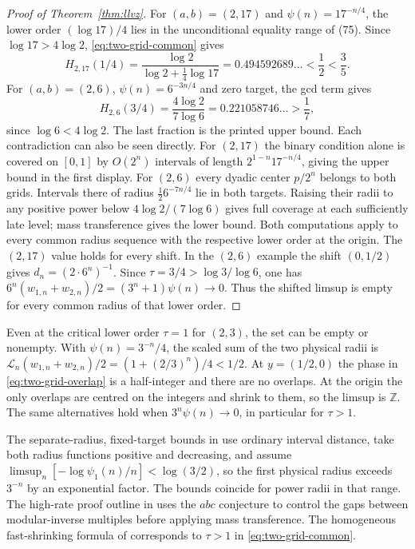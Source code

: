 \documentclass[11pt,reqno,a4paper]{amsart}
\theoremstyle{remark}
\numberwithin{equation}{section}
\begin{document}
\begin{proof}[Proof of Theorem~\ref{thm:llvz}]
For \((a,b)=(2,17)\) and \(\psi(n)=17^{-n/4}\), the lower order
\((\log17)/4\) lies in the unconditional equality range of (75).
Since \(\log17>4\log2\), \eqref{eq:two-grid-common} gives
\[
  H_{2,17}(1/4)=\frac{\log2}{\log2+\frac14\log17}
       =0.494592689\ldots <\frac12<\frac35.
\]
For \((a,b)=(2,6)\), \(\psi(n)=6^{-3n/4}\) and zero target, the
gcd term gives
\[
  H_{2,6}(3/4)=\frac{4\log2}{7\log6}
       =0.221058746\ldots >\frac17 ,
\]
since \(\log6<4\log2\). The last fraction is the printed upper
bound. Each contradiction can also be seen directly. For \((2,17)\)
the binary condition alone is covered on \([0,1]\) by \(O(2^n)\)
intervals of length \(2^{1-n}17^{-n/4}\), giving the upper bound
in the first display. For \((2,6)\) every dyadic center \(p/2^n\)
belongs to both grids. Intervals there of radius \(\tfrac12 6^{-7n/4}\)
lie in both targets. Raising their radii to any positive power below
\(4\log2/(7\log6)\) gives full coverage at each sufficiently late
level; mass transference gives the lower bound.
Both computations apply to every common radius sequence
with the respective lower order at the origin. The \((2,17)\)
value holds for every shift. In the \((2,6)\) example the shift
\((0,1/2)\) gives \(d_n=(2\cdot6^n)^{-1}\). Since
\(\tau=3/4>\log3/\log6\), one has
\(6^n(w_{1,n}+w_{2,n})/2=(3^n+1)\psi(n)\to0\). Thus the shifted
limsup is empty for every common radius of that lower order.
\end{proof}

Even at the critical lower order \(\tau=1\) for \((2,3)\),
the set can be empty or nonempty. With \(\psi(n)=3^{-n}/4\),
the scaled sum of the two physical radii is
\(\mathcal L_n(w_{1,n}+w_{2,n})/2=(1+(2/3)^n)/4<1/2\).
At \(y=(1/2,0)\) the phase in \eqref{eq:two-grid-overlap}
is a half-integer and there are no overlaps. At the origin
the only overlaps are centred on the integers and shrink to
them, so the limsup is \(\mathbb Z\). The same alternatives
hold when \(3^n\psi(n)\to0\), in particular for \(\tau>1\).

The separate-radius, fixed-target bounds in
\cite[slide~14]{Liao} use ordinary interval distance, take both radius functions positive and decreasing, and assume
\(\limsup_n[-\log\psi_1(n)/n]<\log(3/2)\), so the first
physical radius exceeds \(3^{-n}\) by an exponential factor.
The bounds coincide for power radii in that range.
The high-rate proof outline in \cite[slide~20]{Liao} uses the
\(abc\) conjecture to control the gaps between modular-inverse
multiples before applying mass transference.
The homogeneous fast-shrinking formula of
\cite[Theorem~1.3]{LLW} corresponds to \(\tau>1\) in
\eqref{eq:two-grid-common}.
\end{document}
